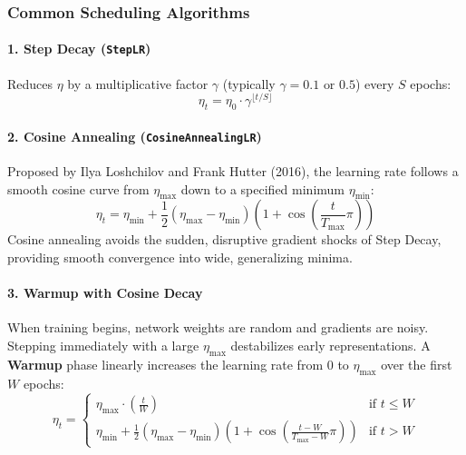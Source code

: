 \subsubsection{Common Scheduling Algorithms}

\paragraph{1. Step Decay (\texttt{StepLR})}
Reduces $\eta$ by a multiplicative factor $\gamma$ (typically $\gamma = 0.1\text{ or }0.5$) every $S$ epochs:
\begin{equation}
\eta_t = \eta_0 \cdot \gamma^{\lfloor t / S \rfloor}\label{eq:step_lr}
\end{equation}

\paragraph{2. Cosine Annealing (\texttt{CosineAnnealingLR})}
Proposed by Ilya Loshchilov and Frank Hutter (2016), the learning rate follows a smooth cosine curve from $\eta_{\max}$ down to a specified minimum $\eta_{\min}$:
\begin{equation}
\eta_t = \eta_{\min} + \frac{1}{2}\left(\eta_{\max} - \eta_{\min}\right)\left( 1 + \cos\left( \frac{t}{T_{\max}} \pi \right) \right)\label{eq:cosine_annealing}
\end{equation}
Cosine annealing avoids the sudden, disruptive gradient shocks of Step Decay, providing smooth convergence into wide, generalizing minima.

\paragraph{3. Warmup with Cosine Decay}
When training begins, network weights are random and gradients are noisy. Stepping immediately with a large $\eta_{\max}$ destabilizes early representations. A \textbf{Warmup} phase linearly increases the learning rate from $0$ to $\eta_{\max}$ over the first $W$ epochs:
\begin{equation}
\eta_t = 
\begin{cases}
\eta_{\max} \cdot \left(\frac{t}{W}\right) & \text{if } t \le W \\[6pt]
\eta_{\min} + \frac{1}{2}(\eta_{\max} - \eta_{\min})\left(1 + \cos\left( \frac{t - W}{T_{\max} - W}\pi \right)\right) & \text{if } t > W
\end{cases}\label{eq:warmup_cosine}
\end{equation}

